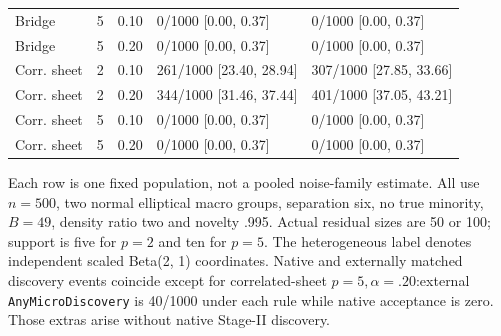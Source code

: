 \begin{table}[htbp]
\begin{tabular}{lrrll}
Bridge & 5 & 0.10 & 0/1000 [0.00, 0.37] & 0/1000 [0.00, 0.37] \\
Bridge & 5 & 0.20 & 0/1000 [0.00, 0.37] & 0/1000 [0.00, 0.37] \\
Corr. sheet & 2 & 0.10 & 261/1000 [23.40, 28.94] & 307/1000 [27.85, 33.66] \\
Corr. sheet & 2 & 0.20 & 344/1000 [31.46, 37.44] & 401/1000 [37.05, 43.21] \\
Corr. sheet & 5 & 0.10 & 0/1000 [0.00, 0.37] & 0/1000 [0.00, 0.37] \\
Corr. sheet & 5 & 0.20 & 0/1000 [0.00, 0.37] & 0/1000 [0.00, 0.37] \\
\bottomrule
\end{tabular}
\par\smallskip\noindent\begin{minipage}{\linewidth}\scriptsize\begin{revblock}Each row is one fixed population, not a pooled noise-family estimate. All use $n=500$, two normal elliptical macro groups, separation six, no true minority,$B=49$, density ratio two and novelty .995. Actual residual sizes are 50 or 100; support is five for $p=2$ and ten for $p=5$. The heterogeneous label denotes independent scaled Beta(2, 1) coordinates. Native and externally matched discovery events coincide except for correlated-sheet $p=5,\alpha=.20$:external \texttt{AnyMicroDiscovery} is 40/1000 under each rule while native acceptance is zero. Those extras arise without native Stage-II discovery.\end{revblock}\end{minipage}
\end{table}
